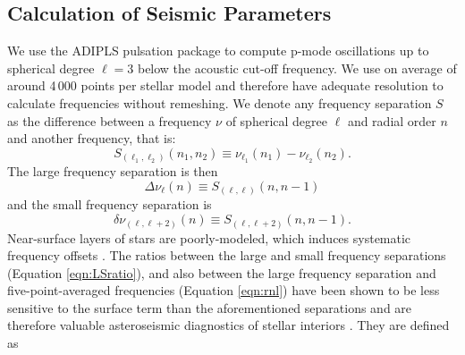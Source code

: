 \documentclass[twocolumn,twocolappendix]{aastex6}
\begin{document}


\subsection{Calculation of Seismic Parameters}
\label{sec:seis}
We use the ADIPLS pulsation package \citep{2008ApSS.316..113C} to compute p-mode oscillations up to spherical degree $\ell=3$ below the acoustic cut-off frequency. We use on average of around 4\,000 points per stellar model and therefore have adequate resolution to calculate frequencies without remeshing. We denote any frequency separation $S$ as the difference between a frequency $\nu$ of spherical degree $\ell$ and radial order $n$ and another frequency, that is: 
\begin{equation} 
  S_{(\ell_1, \ell_2)}(n_1, n_2) \equiv \nu_{\ell_1}(n_1) - \nu_{\ell_2}(n_2).
\end{equation}
The large frequency separation is then
\begin{equation} 
  \Delta\nu_\ell(n) \equiv S_{(\ell, \ell)}(n, n-1)
\end{equation}
and the small frequency separation is
\begin{equation}
  \delta\nu_{(\ell, \ell+2)}(n) \equiv S_{(\ell, \ell+2)}(n, n-1).
\end{equation}
Near-surface layers of stars are poorly-modeled, which induces systematic frequency offsets \citep[see e.g.][]{1999A&A...351..689R}. The ratios between the large and small frequency separations (Equation \ref{eqn:LSratio}), and also between the large frequency separation and five-point-averaged frequencies (Equation \ref{eqn:rnl}) have been shown to be less sensitive to the surface term than the aforementioned separations and are therefore valuable asteroseismic diagnostics of stellar interiors \citep{2003A&A...411..215R}. They are defined as
\end{document}
